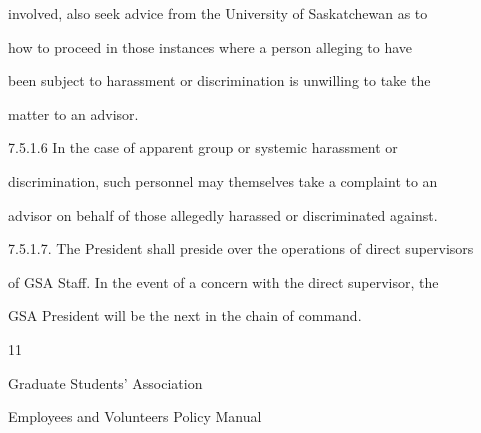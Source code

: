           involved,  also seek  advice  from the University of  Saskatchewan  as to  

         how  to  proceed  in  those  instances  where  a  person  alleging  to  have  

         been  subject  to  harassment  or discrimination  is unwilling  to  take  the  

         matter to an advisor.  



  



7.5.1.6   In       the     case     of    apparent        group       or    systemic        harassment          or  

          discrimination,  such personnel may themselves take a complaint to an  

          advisor on behalf of those allegedly harassed or discriminated against.  



7.5.1.7. The President  shall preside over the  operations  of  direct  supervisors    

          of  GSA  Staff. In the event of a concern with the direct  supervisor, the  

          GSA President will be the next in the chain of command.  



  



                                                        11  

  

  

                                   Graduate  Students’ Association  



                         Employees and Volunteers Policy Manual  

